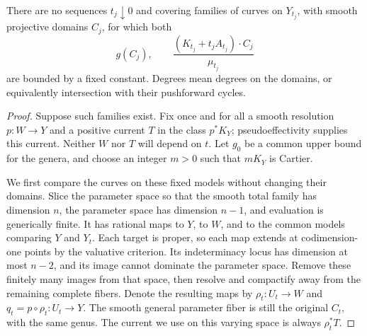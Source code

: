 \begin{proposition}\label{prop:bounded-curves}
There are no sequences \(t_j\downarrow0\) and covering
families of curves on \(Y_{t_j}\), with smooth projective
domains \(C_j\), for which both
\[
 g(C_j),\qquad
 \frac{(K_{t_j}+t_jA_{t_j})\cdot C_j}{\mu_{t_j}}
\]
are bounded by a fixed constant. Degrees mean degrees on
the domains, or equivalently intersection with their
pushforward cycles.
\end{proposition}
\begin{proof}
Suppose such families exist. Fix once and for all a smooth
resolution \(p:W\to Y\) and a positive current \(T\) in
the class \(p^*K_Y\); pseudoeffectivity supplies this current.
Neither \(W\) nor \(T\) will depend on \(t\). Let \(g_0\)
be a common upper bound for the genera, and choose an integer
\(m>0\) such that \(mK_Y\) is Cartier.

We first compare the curves on these fixed models without
changing their domains. Slice the parameter space so that the
smooth total family has dimension \(n\), the parameter space
has dimension \(n-1\), and evaluation is generically finite.
It has rational maps to \(Y\), to \(W\), and to the common
models comparing \(Y\) and \(Y_t\). Each target is proper,
so each map extends at codimension-one points by the valuative
criterion. Its indeterminacy locus has dimension at most
\(n-2\), and its image cannot dominate the parameter space.
Remove these finitely many images from that space, then resolve
and compactify away from the remaining complete fibers.
Denote the resulting maps by
\(\rho_t:U_t\to W\) and \(q_t=p\circ\rho_t:U_t\to Y\).
The smooth general parameter fiber is still the original
\(C_t\), with the same genus. The current we use on this
varying space is always \(\rho_t^*T\).


\end{proof}

